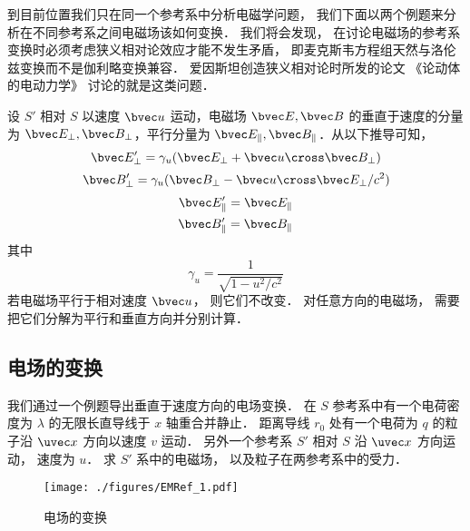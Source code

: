 
\begin{issues}
\issueTODO
{}
\end{issues}


到目前位置我们只在同一个参考系中分析电磁学问题， 我们下面以两个例题来分析在不同参考系之间电磁场该如何变换． 我们将会发现， 在讨论电磁场的参考系变换时必须考虑狭义相对论效应才能不发生矛盾， 即麦克斯韦方程组天然与洛伦兹变换而不是伽利略变换兼容． 爱因斯坦创造狭义相对论时所发的论文 《论动体的电动力学》 讨论的就是这类问题．

设 $S'$ 相对 $S$ 以速度 $\bvec u$ 运动，电磁场 $\bvec E, \bvec B$ 的垂直于速度的分量为 $\bvec E_\perp, \bvec B_\perp$，平行分量为 $\bvec E_\parallel, \bvec B_\parallel$．从以下推导可知，
\begin{equation}\label{EMRef_eq1}
\bvec E_\perp' = \gamma_u (\bvec E_\perp + \bvec u \cross \bvec B_\perp)
\end{equation}
\begin{equation}\label{EMRef_eq2}
\bvec B_\perp' = \gamma_u (\bvec B_\perp - \bvec u \cross \bvec E_\perp/c^2)
\end{equation}
\begin{equation}
\begin{aligned}
\bvec E_\parallel' =\bvec E_\parallel\\ 
\bvec B_\parallel' =\bvec B_\parallel
\end{aligned}
\end{equation}
其中
\begin{equation}
\gamma_u = \frac{1}{\sqrt{1 - u^2/c^2}}
\end{equation}
若电磁场平行于相对速度 $\bvec u$， 则它们不改变． 对任意方向的电磁场， 需要把它们分解为平行和垂直方向并分别计算．

\subsection{电场的变换}
我们通过一个例题导出垂直于速度方向的电场变换． 在 $S$ 参考系中有一个电荷密度为 $\lambda$ 的无限长直导线于 $x$ 轴重合并静止． 距离导线 $r_0$ 处有一个电荷为 $q$ 的粒子沿 $\uvec x$ 方向以速度 $v$ 运动． 另外一个参考系 $S'$ 相对 $S$ 沿 $\uvec x$ 方向运动， 速度为 $u$． 求 $S'$ 系中的电磁场， 以及粒子在两参考系中的受力．
\begin{figure}[ht]
\centering
\texttt{[image: ./figures/EMRef\_1.pdf]}
\caption{电场的变换} \label{EMRef_fig1}
\end{figure}

